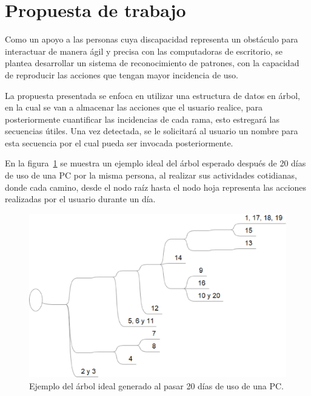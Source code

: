 \section{Propuesta de trabajo}

Como un apoyo a las personas cuya discapacidad representa un obst\'aculo para
 interactuar de manera \'agil y precisa con las computadoras de escritorio, se
 plantea desarrollar un sistema de reconocimiento de patrones, con la capacidad
 de reproducir las acciones que tengan mayor incidencia de uso. 
 
La propuesta presentada se enfoca en utilizar una estructura de datos en
 \'arbol, en la cual se van a almacenar las acciones que el usuario realice, para
 posteriormente cuantificar las incidencias de cada rama, esto estregar\'a las
 secuencias \'utiles. Una vez detectada, se le solicitar\'a al usuario un nombre
 para esta secuencia por el cual pueda ser invocada posteriormente. 
 
En la figura~\ref{fig:arbol} se muestra un ejemplo ideal del \'arbol esperado
 despu\'es de 20 d\'ias de uso de una PC por la misma persona, al realizar sus
 actividades cotidianas, donde cada camino, desde el nodo ra\'iz hasta el nodo
 hoja representa las acciones realizadas por el usuario durante un d\'ia.
 
\begin{figure}[h]
\centering
\includegraphics[width=0.8\columnwidth]{chap1/Imagenes/Arbol.eps}
\caption{Ejemplo del \'arbol ideal generado al pasar 20 d\'ias de uso de una PC.}
\label{fig:arbol}
\end{figure}